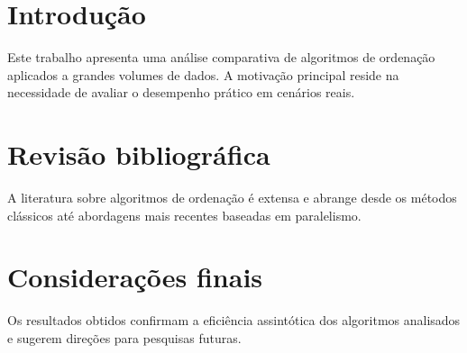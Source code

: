 \documentclass{abnt}
\begin{document}
\pretextual

\imprimircapa

\imprimirfolhaderosto

\subtitulo{}
\coorientador{}

\imprimircapa

\imprimirfolhaderosto

\textual

\chapter{Introdução}

Este trabalho apresenta uma análise comparativa de algoritmos de ordenação
aplicados a grandes volumes de dados. A motivação principal reside na
necessidade de avaliar o desempenho prático em cenários reais.

\chapter{Revisão bibliográfica}

A literatura sobre algoritmos de ordenação é extensa e abrange desde os
métodos clássicos até abordagens mais recentes baseadas em paralelismo.

\chapter{Considerações finais}

Os resultados obtidos confirmam a eficiência assintótica dos algoritmos
analisados e sugerem direções para pesquisas futuras.
\end{document}
